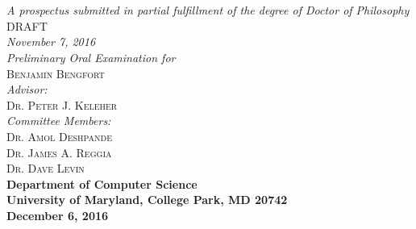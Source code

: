 \documentclass{article}
\begin{document}
\begin{titlepage}
\begin{center}

\textsc{\huge \bfseries {}}\\
\textsc{\huge \bfseries {}}\\[1.0cm]

\emph{A prospectus submitted in partial fulfillment of the degree of Doctor of
Philosophy}\\[5.5cm]

\textsc{\large DRAFT}\\
\emph{November 7, 2016}\\[2.0cm]

\emph{Preliminary Oral Examination for}\\
\textsc{\large Benjamin Bengfort}\\[2.0cm] %
\emph{Advisor:} \\
\textsc{Dr. Peter J. Keleher}\\[.5cm]
\emph{Committee Members:}\\
\textsc{Dr. Amol Deshpande}\\
\textsc{Dr. James A. Reggia}\\
\textsc{Dr. Dave Levin}\\[4.0cm]

{\bfseries Department of Computer Science}\\
{\bfseries University of Maryland, College Park, MD 20742}\\
{\bfseries December 6, 2016}
\vfill

\end{center}

\end{titlepage}

\newpage
\thispagestyle{empty}
\mbox{}
\end{document}
